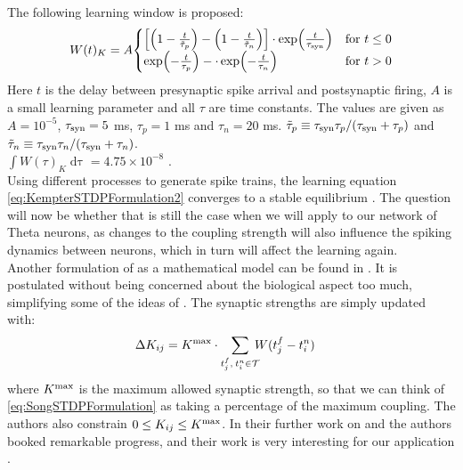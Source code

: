 The following learning window is proposed:
\begin{align}
W(t)_K = A
\begin{cases}
\left[\left(1-\frac{t}{\tilde{\tau}_{p}}\right) - \left(1-\frac{t}{\tilde{\tau}_{n}}\right)\right] \cdot \exp \left( \frac{t}{\tau_{\rm syn}} \right) & \text{for } t \leq 0 \\
 \exp \left(-\frac{t}{\tau_{p}}\right) - \cdot \exp \left(-\frac{t}{\tau_{n}} \right) & \text{for } t > 0
\end{cases} \label{eq:learningwindowKempter1999}
\end{align}
Here $t$ is the delay between presynaptic spike arrival and postsynaptic firing, $A$ is a small learning parameter and all $\tau$ are time constants. The values are given as $A = 10^{-5}$, $\tau_{\rm syn} = 5$ ms, $\tau_{p} = 1$ ms and $\tau_{n} = 20$ ms. $\tilde{\tau}_{p} \equiv \tau_{\rm syn} \tau_{p} / (\tau_{\rm syn} + \tau_{p})$ and $\tilde{\tau}_{n} \equiv \tau_{\rm syn} \tau_{n} / (\tau_{\rm syn} + \tau_{n})$. \\
$\int W(\tau)_K \mathop{d \tau} = 4.75 \times 10^{-8}$ \cite{Kempter1999}. \\

Using different processes to generate spike trains, the learning equation \eqref{eq:KempterSTDPFormulation2} converges to a stable equilibrium \cite{Kempter1999}. The question will now be whether that is still the case when we will apply \STDP to our network of Theta neurons, as changes to the coupling strength will also influence the spiking dynamics between neurons, which in turn will affect the learning again.\\

Another formulation of \STDP as a mathematical model can be found in \cite{Song2000}. It is postulated without being concerned about the biological aspect too much, simplifying some of the ideas of \cite{Kempter1999}. The synaptic strengths are simply updated with:
\begin{align}
\Delta K_{ij} &= K^{\rm max} \cdot \sum_{t_{j}^{f}, \: t_i^{n} \in \mathcal{T}} \hspace{-2mm} W (t_{j}^{f}-t_i^{n} ) \label{eq:SongSTDPFormulation}
\end{align}
where $K^{\rm max}$ is the maximum allowed synaptic strength, so that we can think of \eqref{eq:SongSTDPFormulation} as taking a percentage of the maximum coupling. The authors also constrain $0 \leq K_{ij} \leq K^{\rm max}$. In their further work on \STDP and \IP the authors booked remarkable progress, and their work is very interesting for our application \cite{Song2017}. \\

